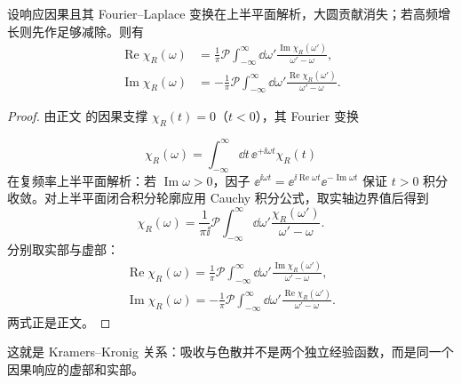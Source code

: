 \begin{proposition}
设响应因果且其 Fourier--Laplace 变换在上半平面解析，大圆贡献消失；若高频增长则先作足够减除。则有
\begin{equation}
 {
 \begin{aligned}
 \operatorname{Re}\chi_R(\omega)
 &=\frac1\pi\mathcal P\int_{-\infty}^{\infty}\dd\omega'
 \frac{\operatorname{Im}\chi_R(\omega')}{\omega'-\omega},\\
 \operatorname{Im}\chi_R(\omega)
 &=-\frac1\pi\mathcal P\int_{-\infty}^{\infty}\dd\omega'
 \frac{\operatorname{Re}\chi_R(\omega')}{\omega'-\omega}.
 \end{aligned}}
\label{eq:kramers-kronig-r68}
\end{equation}
\end{proposition}
\begin{proof}
由正文 的因果支撑 $\chi_R(t)=0$（$t<0$），其 Fourier 变换

\begin{equation*}
 \chi_R(\omega)=\int_{-\infty}^{\infty}\dd t\,\ee^{+\ii\omega t}\chi_R(t)
\end{equation*}
在复频率上半平面解析：若 $\operatorname{Im}\omega>0$，因子 $\ee^{\ii\omega t}=\ee^{\ii\operatorname{Re}\omega t}\ee^{-\operatorname{Im}\omega t}$ 保证 $t>0$ 积分收敛。对上半平面闭合积分轮廓应用 Cauchy 积分公式，取实轴边界值后得到
\begin{equation*}
 \chi_R(\omega)
 =\frac1{\pi\ii}
 \mathcal P\int_{-\infty}^{\infty}\dd\omega'
 \frac{\chi_R(\omega')}{\omega'-\omega}.
\end{equation*}
分别取实部与虚部：
\begin{align*}
 {
 \operatorname{Re}\chi_R(\omega)
 =\frac1\pi\mathcal P\int_{-\infty}^{\infty}\dd\omega'
 \frac{\operatorname{Im}\chi_R(\omega')}{\omega'-\omega}},\\
 {
 \operatorname{Im}\chi_R(\omega)
 =-\frac1\pi\mathcal P\int_{-\infty}^{\infty}\dd\omega'
 \frac{\operatorname{Re}\chi_R(\omega')}{\omega'-\omega}}.
 \end{align*}
两式正是正文。
\end{proof}

这就是 Kramers--Kronig 关系：吸收与色散并不是两个独立经验函数，而是同一个因果响应的虚部和实部。


